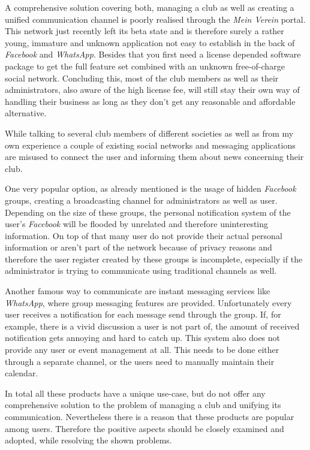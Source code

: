 A comprehensive solution covering both, managing a club as well as creating a unified communication channel is poorly realised through the \emph{Mein Verein} portal. This network just recently left its beta state and is therefore surely a rather young, immature and unknown application not easy to establish in the back of \emph{Facebook} and \emph{WhatsApp}. Besides that you first need a license depended software package to get the full feature set combined with an unknown free-of-charge social network. Concluding this, most of the club members as well as their administrators, also aware of the high license fee, will still stay their own way of handling their business as long as they don't get any reasonable and affordable alternative. 

While talking to several club members of different societies as well as from my own experience a couple of existing social networks and messaging applications are misused to connect the user and informing them about news concerning their club. 

One very popular option, as already mentioned is the usage of hidden \emph{Facebook} groups, creating a broadcasting channel for administrators as well as user. Depending on the size of these groups, the personal notification system of the user's \emph{Facebook} will be flooded by unrelated and therefore uninteresting information. On top of that many user do not provide their actual personal information or aren't part of the network because of privacy reasons and therefore the user register created by these groups is incomplete, especially if the administrator is trying to communicate using traditional channels as well. 

Another famous way to communicate are instant messaging services like \emph{WhatsApp}, where group messaging features are provided. Unfortunately every user receives a notification for each message send through the group. If, for example, there is a vivid discussion a user is not part of, the amount of received notification gets annoying and hard to catch up. This system also does not provide any user or event management at all. This needs to be done either through a separate channel, or the users need to manually maintain their calendar.

In total all these products have a unique use-case, but do not offer any comprehensive solution to the problem of managing a club and unifying its communication. Nevertheless there is a reason that these products are popular among users. Therefore the positive aspects should be closely examined and adopted, while resolving the shown problems.

